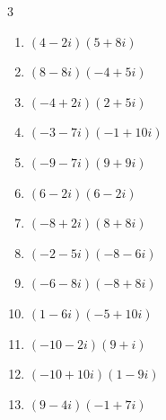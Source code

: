 \begin{multicols}{3}
\begin{enumerate}
        \phantom{$\displaystyle =15-26i$}

  \item $\displaystyle (4-2i)(5+8i)$

        \phantom{$\displaystyle =36+22i$}

  \item $\displaystyle (8-8i)(-4+5i)$

        \phantom{$\displaystyle =8+72i$}

  \item $\displaystyle (-4+2i)(2+5i)$

        \phantom{$\displaystyle =-18-16i$}

  \item $\displaystyle (-3-7i)(-1+10i)$

        \phantom{$\displaystyle =73-23i$}

  \item $\displaystyle (-9-7i)(9+9i)$

        \phantom{$\displaystyle =-18-144i$}

  \item $\displaystyle (6-2i)(6-2i)$

        \phantom{$\displaystyle =32-24i$}

  \item $\displaystyle (-8+2i)(8+8i)$

        \phantom{$\displaystyle =-80-48i$}

  \item $\displaystyle (-2-5i)(-8-6i)$

        \phantom{$\displaystyle =-14+52i$}

  \item $\displaystyle (-6-8i)(-8+8i)$

        \phantom{$\displaystyle =112+16i$}

  \item $\displaystyle (1-6i)(-5+10i)$

        \phantom{$\displaystyle =55+40i$}

\columnbreak %

  \item $\displaystyle (-10-2i)(9+i)$

        \phantom{$\displaystyle =-88-28i$}

  \item $\displaystyle (-10+10i)(1-9i)$

        \phantom{$\displaystyle =80+100i$}

  \item $\displaystyle (9-4i)(-1+7i)$


\end{enumerate}
\end{multicols}
